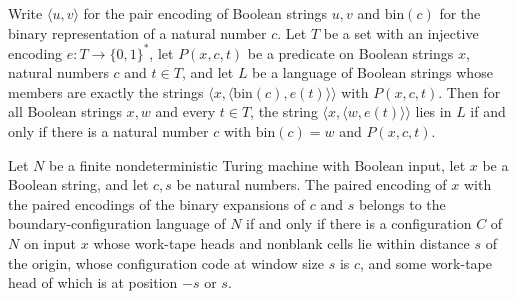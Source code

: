 \begin{theorem}
\label{Complexity.Codec.mem_codeLang_iff}
\leanok
{}
Write $\langle u,v\rangle$ for the pair encoding of Boolean strings $u,v$ and
$\mathrm{bin}(c)$ for the binary representation of a natural number $c$. Let $T$ be a
set with an injective encoding $e:T\to\{0,1\}^*$, let $P(x,c,t)$ be a predicate on
Boolean strings $x$, natural numbers $c$ and $t\in T$, and let $L$ be a language of
Boolean strings whose members are exactly the strings
$\langle x,\langle\mathrm{bin}(c),e(t)\rangle\rangle$ with $P(x,c,t)$. Then for all
Boolean strings $x,w$ and every $t\in T$, the string $\langle x,\langle
w,e(t)\rangle\rangle$ lies in $L$ if and only if there is a natural number $c$ with
$\mathrm{bin}(c)=w$ and $P(x,c,t)$.
\end{theorem}

\begin{theorem}
\label{Complexity.Codec.mem_edgeLang}
\leanok
{}
Let $N$ be a finite nondeterministic Turing machine with Boolean input, let $x$ be a
Boolean string, and let $c,s$ be natural numbers. The paired encoding of $x$ with the
paired encodings of the binary expansions of $c$ and $s$ belongs to the
boundary-configuration language of $N$ if and only if there is a configuration $C$ of
$N$ on input $x$ whose work-tape heads and nonblank cells lie within distance $s$ of the
origin, whose configuration code at window size $s$ is $c$, and some work-tape head of
which is at position $-s$ or $s$.
\end{theorem}
